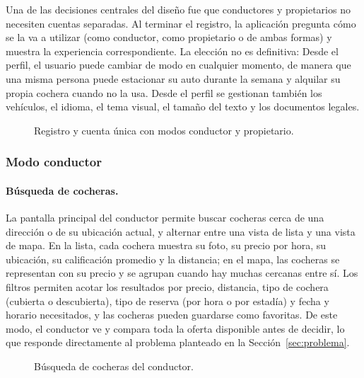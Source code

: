 Una de las decisiones centrales del diseño fue que conductores y propietarios no necesiten cuentas separadas. Al terminar el registro, la aplicación pregunta cómo se la va a utilizar (como conductor, como propietario o de ambas formas) y muestra la experiencia correspondiente. La elección no es definitiva: Desde el perfil, el usuario puede cambiar de modo en cualquier momento, de manera que una misma persona puede estacionar su auto durante la semana y alquilar su propia cochera cuando no la usa. Desde el perfil se gestionan también los vehículos, el idioma, el tema visual, el tamaño del texto y los documentos legales.

\begin{figure}[H]
\centering
{}\hfill
{}\hfill
{}
\caption{Registro y cuenta única con modos conductor y propietario.}
\label{fig:app_cuenta}
\end{figure}

\subsubsection{Modo conductor}

\paragraph{Búsqueda de cocheras.} La pantalla principal del conductor permite buscar cocheras cerca de una dirección o de su ubicación actual, y alternar entre una vista de lista y una vista de mapa. En la lista, cada cochera muestra su foto, su precio por hora, su ubicación, su calificación promedio y la distancia; en el mapa, las cocheras se representan con su precio y se agrupan cuando hay muchas cercanas entre sí. Los filtros permiten acotar los resultados por precio, distancia, tipo de cochera (cubierta o descubierta), tipo de reserva (por hora o por estadía) y fecha y horario necesitados, y las cocheras pueden guardarse como favoritas. De este modo, el conductor ve y compara toda la oferta disponible antes de decidir, lo que responde directamente al problema planteado en la Sección~\ref{sec:problema}.

\begin{figure}[H]
\centering
{}\hspace{0.06\textwidth}
\caption{Búsqueda de cocheras del conductor.}
\label{fig:app_busqueda}
\end{figure}

